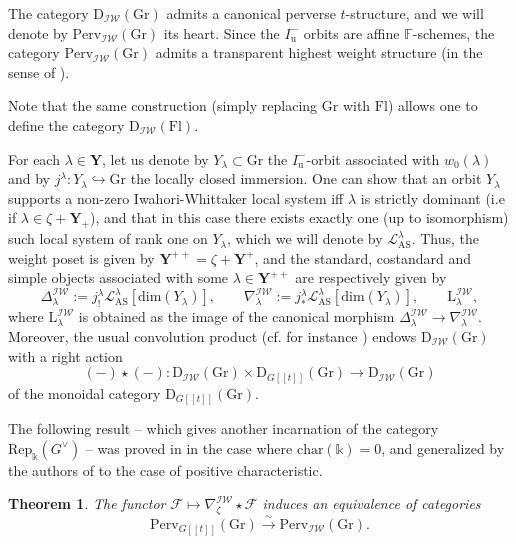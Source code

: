 \documentclass[11pt]{amsart}
\theoremstyle{plain}
\newtheorem{thm}{Theorem}[section]
\theoremstyle{remark}
\numberwithin{equation}{section}
\begin{document}
	The category $\mathrm{D}_{\mathcal{IW}}(\mathrm{Gr})$ admits a canonical perverse $t$-structure, and we will denote by $\mathrm{Perv}_{\mathcal{IW}}(\mathrm{Gr})$ its heart. Since the $I_\mathrm{u}^-$ orbits are affine $\mathbb{F}$-schemes, the category $\mathrm{Perv}_{\mathcal{IW}}(\mathrm{Gr})$ admits a transparent highest weight structure (in the sense of  \cite[3.7]{riche}).

 Note that the same construction (simply replacing $\mathrm{Gr}$ with $\mathrm{Fl}$) allows one to define the category $\mathrm{D}_{\mathcal{IW}}(\mathrm{Fl})$.

 
 For each $\lambda\in \mathbf{Y}$, let us denote by $Y_\lambda\subset\mathrm{Gr}$ the $I_\mathrm{u}^-$-orbit associated with $w_0(\lambda)$ and by $j^\lambda:Y_\lambda\hookrightarrow\mathrm{Gr}$ the locally closed immersion.  One can show that an orbit $Y_\lambda$ supports a non-zero Iwahori-Whittaker local system iff $\lambda$ is strictly dominant (i.e if $\lambda\in \zeta+\mathbf{Y}_+$), and that in this case there exists exactly one (up to isomorphism) such local system of rank one on $Y_\lambda$, which we will denote by $\mathcal{L}^\lambda_{\mathrm{AS}}$. Thus, the weight poset is given by $\mathbf{Y}^{++}=\zeta+\mathbf{Y}^{+}$, and the standard, costandard and simple objects associated with some $\lambda\in\mathbf{Y}^{++}$ are respectively given by
	$$\Delta^{\mathcal{IW}}_\lambda:=j^\lambda_{ !}\mathcal{L}^\lambda_{\mathrm{AS}}[\mathrm{dim}(Y_\lambda)],\qquad \nabla^{\mathcal{IW}}_\lambda:=j^\lambda_{ *}\mathcal{L}^\lambda_{\mathrm{AS}}[\mathrm{dim}(Y_\lambda)],\qquad \mathrm{L}_\lambda^\mathcal{IW},$$
	where $\mathrm{L}_\lambda^\mathcal{IW}$ is obtained as the image of the canonical morphism $\Delta^{\mathcal{IW}}_\lambda\to \nabla^{\mathcal{IW}}_\lambda$.  Moreover, the usual convolution product (cf. for instance \cite[§2.4]{JEP_2019__6__707_0}) endows $\mathrm{D}_{\mathcal{IW}}(\mathrm{Gr})$ with a right action 
	$$(-)\star (-):\mathrm{D}_{\mathcal{IW}}(\mathrm{Gr})\times \mathrm{D}_{G[[t]]}(\mathrm{Gr})\to \mathrm{D}_{\mathcal{IW}}(\mathrm{Gr})$$
	of the monoidal category $\mathrm{D}_{G[[t]]}(\mathrm{Gr})$. 
	
	The following result -- which gives another incarnation of the category $\mathrm{Rep}_\mathbb{k}(G^\vee)$ -- was proved in \cite[§2.2.1]{ABBGM} in the case where $\mathrm{char}(\mathbb{k})=0$, and generalized by the authors of \cite{JEP_2019__6__707_0} to the case of positive characteristic. 
	\begin{thm}\label{thm IW equivalence}
		The functor  $\mathcal{F}\mapsto \nabla^{\mathcal{IW}}_{\zeta}\star \mathcal{F}$ induces an equivalence of categories 
		$$\mathrm{Perv}_{G[[t]]}(\mathrm{Gr})\xrightarrow{\sim}\mathrm{Perv}_{\mathcal{IW}}(\mathrm{Gr}).$$
	\end{thm}
\end{document}
